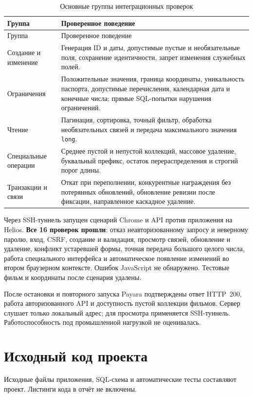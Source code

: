 \begin{longtable}{L{4.0cm}L{11.5cm}}
\caption{Основные группы интеграционных проверок}\\
\toprule Группа & Проверенное поведение\\\midrule\endfirsthead
\toprule Группа & Проверенное поведение\\\midrule\endhead
Создание и изменение & Генерация ID и даты, допустимые пустые и необязательные поля, сохранение идентичности, запрет изменения служебных полей.\\
Ограничения & Положительные значения, граница координаты, уникальность паспорта, допустимые перечисления, календарная дата и конечные числа; прямые SQL-попытки нарушения ограничений.\\
Чтение & Пагинация, сортировка, точный фильтр, обработка необязательных связей и передача максимального значения \texttt{long}.\\
Специальные операции & Среднее пустой и непустой коллекций, массовое удаление, буквальный префикс, остаток перераспределения и строгий порог длины.\\
Транзакции и связи & Откат при переполнении, конкурентные награждения без потерянных обновлений, обновление ревизии после фиксации, направленное каскадное удаление.\\
\bottomrule
\end{longtable}

Через SSH-туннель запущен сценарий Chrome и API против приложения на Helios. \textbf{Все 16 проверок прошли}: отказ неавторизованному запросу и неверному паролю, вход, CSRF, создание и валидация, просмотр связей, обновление и удаление, конфликт устаревшей формы, точная передача большого целого числа, работа специального интерфейса и автоматическое появление изменений во втором браузерном контексте. Ошибок JavaScript не обнаружено. Тестовые фильм и координаты после сценария удалены.

После остановки и повторного запуска Payara подтверждены ответ HTTP~200, работа авторизованного API и доступность пустой коллекции фильмов. Сервер слушает только локальный адрес; для просмотра применяется SSH-туннель. Работоспособность под промышленной нагрузкой не оценивалась.

\section{Исходный код проекта}

Исходные файлы приложения, SQL-схема и автоматические тесты составляют проект. Листинги кода в отчёт не включены.


